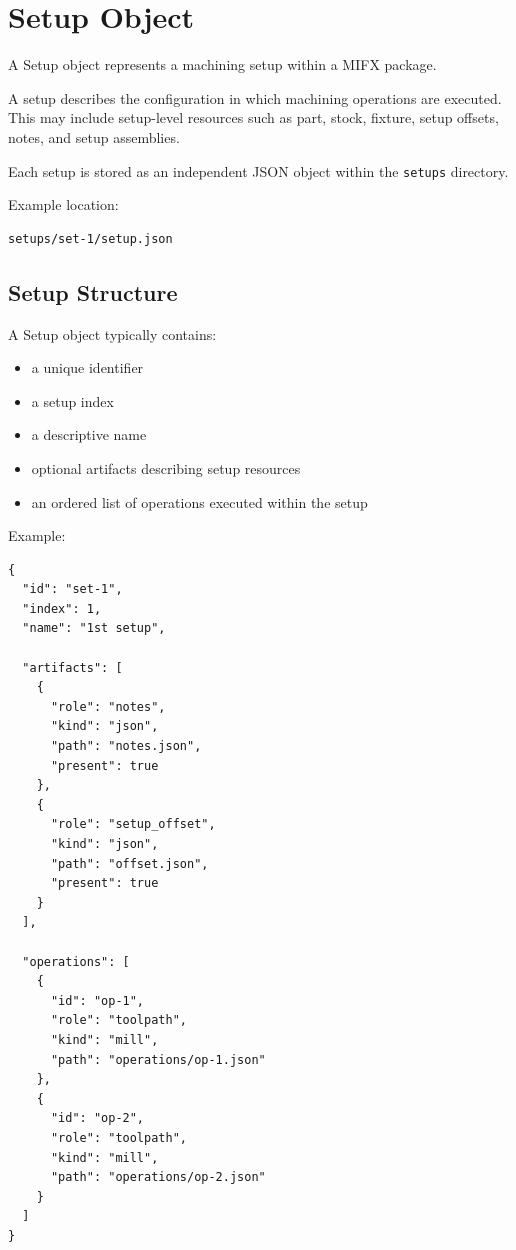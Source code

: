 \section{Setup Object}

A Setup object represents a machining setup within a MIFX package.

A setup describes the configuration in which machining operations are executed.
This may include setup-level resources such as part, stock, fixture, setup offsets, notes, and setup assemblies.

Each setup is stored as an independent JSON object within the \texttt{setups} directory.

Example location:

\begin{verbatim}
setups/set-1/setup.json
\end{verbatim}

\subsection{Setup Structure}

A Setup object typically contains:

\begin{itemize}
\item a unique identifier
\item a setup index
\item a descriptive name
\item optional artifacts describing setup resources
\item an ordered list of operations executed within the setup
\end{itemize}

Example:

\begin{verbatim}
{
  "id": "set-1",
  "index": 1,
  "name": "1st setup",

  "artifacts": [
    {
      "role": "notes",
      "kind": "json",
      "path": "notes.json",
      "present": true
    },
    {
      "role": "setup_offset",
      "kind": "json",
      "path": "offset.json",
      "present": true
    }
  ],

  "operations": [
    {
      "id": "op-1",
      "role": "toolpath",
      "kind": "mill",
      "path": "operations/op-1.json"
    },
    {
      "id": "op-2",
      "role": "toolpath",
      "kind": "mill",
      "path": "operations/op-2.json"
    }
  ]
}
\end{verbatim}

